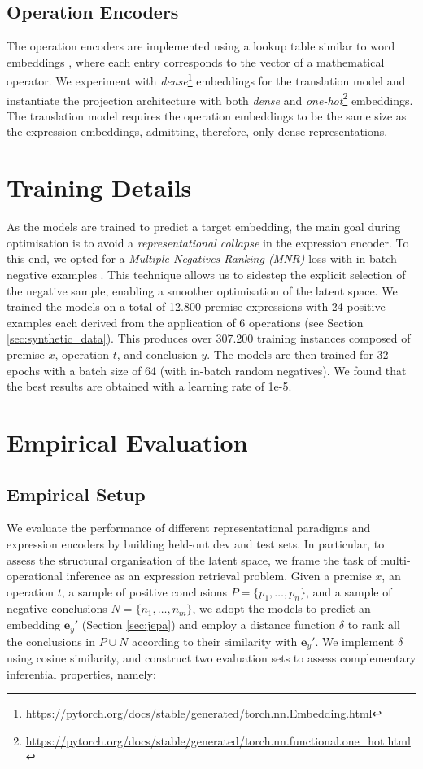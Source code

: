 \documentclass[11pt]{article}
\begin{document}
\subsection{Operation Encoders}
The operation encoders are implemented using a lookup table similar to word embeddings \cite{mikolov2013efficient}, where each entry corresponds to the vector of a mathematical operator. We experiment with \emph{dense}\footnote{\url{https://pytorch.org/docs/stable/generated/torch.nn.Embedding.html}} embeddings for the translation model and instantiate the projection architecture with both \emph{dense} and \emph{one-hot}\footnote{\url{https://pytorch.org/docs/stable/generated/torch.nn.functional.one_hot.html}} embeddings. The translation model requires the operation embeddings to be the same size as the expression embeddings, admitting, therefore, only dense representations.

\section{Training Details}

As the models are trained to predict a target embedding, 
the main goal during optimisation is to avoid a \emph{representational collapse} in the expression encoder.
To this end, we opted for a \emph{Multiple Negatives Ranking (MNR)} loss with in-batch negative examples \cite{henderson2017efficient}. This technique allows us to sidestep the explicit selection of the negative sample, enabling a smoother optimisation of the latent space.   
We trained the models on a total of 12.800 premise expressions with 24 positive examples each derived from the application of 6 operations (see Section \ref{sec:synthetic_data}). This produces over 307.200 training instances composed of premise $x$, operation $t$, and conclusion $y$. The models are then trained for 32 epochs with a batch size of 64 (with in-batch random negatives). We found that the best results are obtained with a learning rate of 1e-5.

\section{Empirical Evaluation}

\subsection{Empirical Setup}
We evaluate the performance of different representational paradigms and expression encoders by building held-out dev and test sets. In particular, to assess the structural organisation of the latent space, we frame the task of multi-operational inference as an expression retrieval problem. 
Given a premise $x$, an operation $t$, a sample of positive conclusions $P = \{p_1, \ldots, p_n\}$, and a sample of negative conclusions $N = \{n_1, \ldots, n_m\}$, we adopt the models to predict an embedding $\textbf{e}_y'$ (Section \ref{sec:jepa}) and employ a distance function $\delta$ to rank all the conclusions in $P \cup N$ according to their similarity with $\textbf{e}_y'$. We implement $\delta$ using cosine similarity, and construct two evaluation sets to assess complementary inferential properties, namely:
\end{document}
